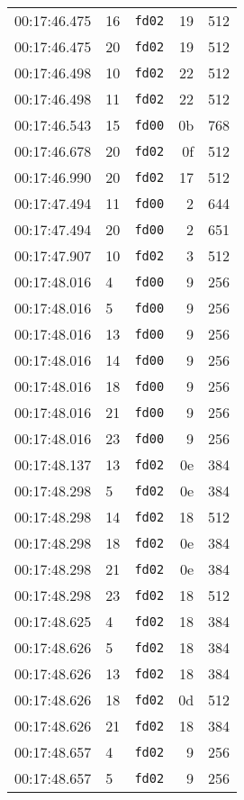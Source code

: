 \documentclass{article}
\begin{document}
\begin{longtable}{lllrr}
00:17:46.475 & 16 & \texttt{fd02} & 19 & 512 \\
00:17:46.475 & 20 & \texttt{fd02} & 19 & 512 \\
00:17:46.498 & 10 & \texttt{fd02} & 22 & 512 \\
00:17:46.498 & 11 & \texttt{fd02} & 22 & 512 \\
00:17:46.543 & 15 & \texttt{fd00} & 0b & 768 \\
00:17:46.678 & 20 & \texttt{fd02} & 0f & 512 \\
00:17:46.990 & 20 & \texttt{fd02} & 17 & 512 \\
00:17:47.494 & 11 & \texttt{fd00} & 2 & 644 \\
00:17:47.494 & 20 & \texttt{fd00} & 2 & 651 \\
00:17:47.907 & 10 & \texttt{fd02} & 3 & 512 \\
00:17:48.016 & 4 & \texttt{fd00} & 9 & 256 \\
00:17:48.016 & 5 & \texttt{fd00} & 9 & 256 \\
00:17:48.016 & 13 & \texttt{fd00} & 9 & 256 \\
00:17:48.016 & 14 & \texttt{fd00} & 9 & 256 \\
00:17:48.016 & 18 & \texttt{fd00} & 9 & 256 \\
00:17:48.016 & 21 & \texttt{fd00} & 9 & 256 \\
00:17:48.016 & 23 & \texttt{fd00} & 9 & 256 \\
00:17:48.137 & 13 & \texttt{fd02} & 0e & 384 \\
00:17:48.298 & 5 & \texttt{fd02} & 0e & 384 \\
00:17:48.298 & 14 & \texttt{fd02} & 18 & 512 \\
00:17:48.298 & 18 & \texttt{fd02} & 0e & 384 \\
00:17:48.298 & 21 & \texttt{fd02} & 0e & 384 \\
00:17:48.298 & 23 & \texttt{fd02} & 18 & 512 \\
00:17:48.625 & 4 & \texttt{fd02} & 18 & 384 \\
00:17:48.626 & 5 & \texttt{fd02} & 18 & 384 \\
00:17:48.626 & 13 & \texttt{fd02} & 18 & 384 \\
00:17:48.626 & 18 & \texttt{fd02} & 0d & 512 \\
00:17:48.626 & 21 & \texttt{fd02} & 18 & 384 \\
00:17:48.657 & 4 & \texttt{fd02} & 9 & 256 \\
00:17:48.657 & 5 & \texttt{fd02} & 9 & 256 \\

\end{longtable}
\end{document}
